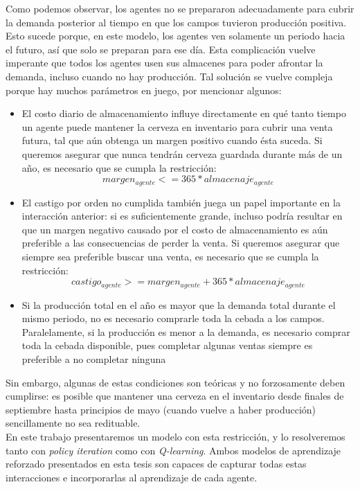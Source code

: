 Como podemos observar, los agentes no se prepararon adecuadamente para cubrir la demanda posterior al tiempo en que los campos tuvieron producci\'on positiva. Esto sucede porque, en este modelo, los agentes ven solamente un periodo hacia el futuro, as\'i que solo se preparan para ese d\'ia. Esta complicaci\'on vuelve imperante que todos los agentes usen sus almacenes para poder afrontar la demanda, incluso cuando no hay producci\'on. Tal soluci\'on se vuelve compleja porque hay muchos par\'ametros en juego, por mencionar algunos:
\begin{itemize}
    \item El costo diario de almacenamiento influye directamente en qu\'e tanto tiempo un agente puede mantener la cerveza en inventario para cubrir una venta futura, tal que a\'un obtenga un margen positivo cuando \'esta suceda. Si queremos asegurar que nunca tendr\'an cerveza guardada durante m\'as de un a\~no, es necesario que se cumpla la restricci\'on:
    $$
    margen_{agente} <= 365*almacenaje_{agente}
    $$
    \item El castigo por orden no cumplida tambi\'en juega un papel importante en la interacci\'on anterior: si es suficientemente grande, incluso podr\'ia resultar en que un margen negativo causado por el costo de almacenamiento es a\'un preferible a las consecuencias de perder la venta. Si queremos asegurar que siempre sea preferible buscar una venta, es necesario que se cumpla la restricci\'on:
    $$
    castigo_{agente} >= margen_{agente} + 365*almacenaje_{agente}
    $$
    \item Si la producci\'on total en el a\~no es mayor que la demanda total durante el mismo periodo, no es necesario comprarle toda la cebada a los campos. Paralelamente, si la producci\'on es menor a la demanda, es necesario comprar toda la cebada disponible, pues completar algunas ventas siempre es preferible a no completar ninguna
\end{itemize}

Sin embargo, algunas de estas condiciones son te\'oricas y no forzosamente deben cumplirse: es posible que mantener una cerveza en el inventario desde finales de septiembre hasta principios de mayo (cuando vuelve a haber producci\'on) sencillamente no sea redituable. \\

En este trabajo presentaremos un modelo con esta restricci\'on, y lo resolveremos tanto con \textit{policy iteration} como con \textit{Q-learning}. Ambos modelos de aprendizaje reforzado presentados en esta tesis son capaces de capturar todas estas interacciones e incorporarlas al aprendizaje de cada agente.

